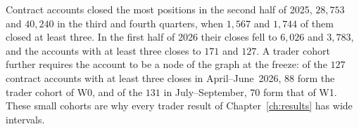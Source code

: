 Contract accounts closed the most positions in the second half of 2025, $28{,}753$ and $40{,}240$ in the third and fourth quarters, when $1{,}567$ and $1{,}744$ of them closed at least three. In the first half of 2026 their closes fell to $6{,}026$ and $3{,}783$, and the accounts with at least three closes to $171$ and $127$. A trader cohort further requires the account to be a node of the graph at the freeze: of the $127$ contract accounts with at least three closes in April--June~2026, $88$ form the trader cohort of W0, and of the $131$ in July--September, $70$ form that of W1. These small cohorts are why every trader result of Chapter~\ref{ch:results} has wide intervals.

